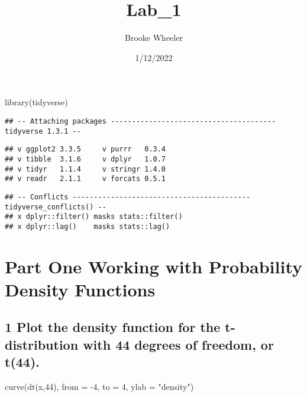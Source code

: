\documentclass[
]{article}
\title{Lab\_1}
\author{Brooke Wheeler}
\date{1/12/2022}
\newenvironment{Shaded}{\begin{snugshade}}{\end{snugshade}}
\newcommand{\AttributeTok}[1]{\textcolor[rgb]{0.77,0.63,0.00}{#1}}
\newcommand{\DecValTok}[1]{\textcolor[rgb]{0.00,0.00,0.81}{#1}}
\newcommand{\FunctionTok}[1]{\textcolor[rgb]{0.00,0.00,0.00}{#1}}
\newcommand{\NormalTok}[1]{#1}
\newcommand{\SpecialCharTok}[1]{\textcolor[rgb]{0.00,0.00,0.00}{#1}}
\newcommand{\StringTok}[1]{\textcolor[rgb]{0.31,0.60,0.02}{#1}}
\begin{document}
\maketitle

\begin{Shaded}
\begin{Highlighting}[]
\FunctionTok{library}\NormalTok{(tidyverse)}
\end{Highlighting}
\end{Shaded}

\begin{verbatim}
## -- Attaching packages --------------------------------------- tidyverse 1.3.1 --
\end{verbatim}

\begin{verbatim}
## v ggplot2 3.3.5     v purrr   0.3.4
## v tibble  3.1.6     v dplyr   1.0.7
## v tidyr   1.1.4     v stringr 1.4.0
## v readr   2.1.1     v forcats 0.5.1
\end{verbatim}

\begin{verbatim}
## -- Conflicts ------------------------------------------ tidyverse_conflicts() --
## x dplyr::filter() masks stats::filter()
## x dplyr::lag()    masks stats::lag()
\end{verbatim}

\hypertarget{part-one-working-with-probability-density-functions}{%
\section{Part One Working with Probability Density
Functions}\label{part-one-working-with-probability-density-functions}}

\hypertarget{plot-the-density-function-for-the-t-distribution-with-44-degrees-of-freedom-or-t44.}{%
\subsection{1 Plot the density function for the t-distribution with 44
degrees of freedom, or
t(44).}\label{plot-the-density-function-for-the-t-distribution-with-44-degrees-of-freedom-or-t44.}}

\begin{Shaded}
\begin{Highlighting}[]
\FunctionTok{curve}\NormalTok{(}\FunctionTok{dt}\NormalTok{(x,}\DecValTok{44}\NormalTok{), }\AttributeTok{from =} \SpecialCharTok{{-}}\DecValTok{4}\NormalTok{, }\AttributeTok{to =} \DecValTok{4}\NormalTok{, }\AttributeTok{ylab =} \StringTok{"density"}\NormalTok{)}
\end{Highlighting}
\end{Shaded}
\end{document}
